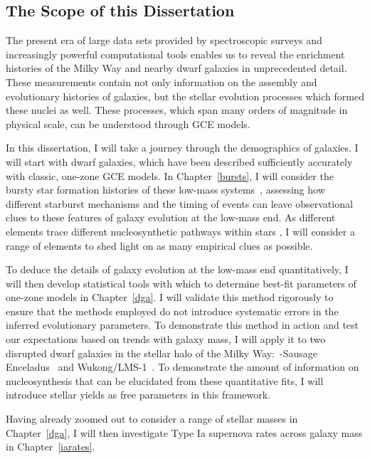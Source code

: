 \documentclass[main.tex]{subfiles}
\begin{document}
\begin{doublespace}
\section{The Scope of this Dissertation}
\label{main:sec:intro:scope}

The present era of large data sets provided by spectroscopic surveys and
increasingly powerful computational tools enables us to reveal the enrichment
histories of the Milky Way and nearby dwarf galaxies in unprecedented detail.
These measurements contain not only information on the assembly and evolutionary
histories of galaxies, but the stellar evolution processes which formed these
nuclei as well.
These processes, which span many orders of magnitude in physical scale, can be
understood through GCE models.
\par
In this dissertation, I will take a journey through the demographics of
galaxies.
I will start with dwarf galaxies, which have been described sufficiently
accurately with classic, one-zone GCE models.
In Chapter~\ref{bursts}, I will consider the bursty star formation histories
of these low-mass systems~\citep[e.g.,][]{Weisz2014a}, assessing how different
starburst mechanisms and the timing of events can leave observational clues to
these features of galaxy evolution at the low-mass end.
As different elements trace different nucleosynthetic pathways within stars
\citep[e.g.,][]{Johnson2019}, I will consider a range of elements to shed light
on as many empirical clues as possible.
\par
To deduce the details of galaxy evolution at the low-mass end quantitatively, I
will then develop statistical tools with which to determine best-fit
parameters of one-zone models in Chapter~\ref{dga}.
I will validate this method rigorously to ensure that the methods employed do
not introduce systematic errors in the inferred evolutionary parameters.
To demonstrate this method in action and test our expectations based on trends
with galaxy mass, I will apply it to two disrupted dwarf galaxies in the
stellar halo of the Milky Way:~\gaia-Sausage Enceladus~\citep{Helmi2018,
Belokurov2018} and Wukong/LMS-1~\citep{Naidu2020, Naidu2022, Yuan2020}.
To demonstrate the amount of information on nucleosynthesis that can be
elucidated from these quantitative fits, I will introduce stellar yields as
free parameters in this framework.
\par
Having already zoomed out to consider a range of stellar masses in
Chapter~\ref{dga}, I will then investigate Type Ia supernova rates across
galaxy mass in Chapter~\ref{iarates}.

\end{doublespace}
\end{document}
